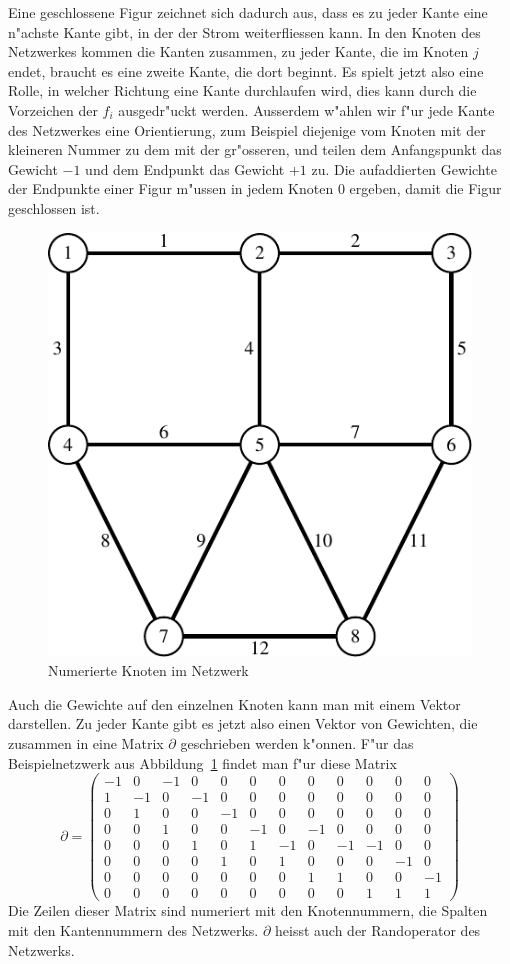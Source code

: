 Eine geschlossene Figur zeichnet sich dadurch aus, dass es zu
jeder Kante eine n"achste Kante gibt, in der der Strom weiterfliessen
kann. In den Knoten des Netzwerkes kommen die Kanten zusammen,
zu jeder Kante, die im Knoten $j$ endet, braucht es eine zweite
Kante, die dort beginnt.
Es spielt jetzt also eine Rolle, in welcher Richtung eine
Kante durchlaufen wird, dies kann durch die Vorzeichen der $f_i$
ausgedr"uckt werden. Ausserdem w"ahlen wir f"ur jede Kante
des Netzwerkes eine Orientierung, zum Beispiel diejenige vom
Knoten mit der kleineren Nummer zu dem mit der gr"osseren,
und teilen dem Anfangspunkt
das Gewicht $-1$ und dem Endpunkt das Gewicht $+1$ zu. Die
aufaddierten Gewichte der Endpunkte einer Figur m"ussen in jedem
Knoten $0$ ergeben, damit die Figur geschlossen ist.
\begin{figure}
\begin{center}
\includegraphics[width=0.6\hsize]{images/kirchhoff-2}
\end{center}
\caption{Numerierte Knoten im Netzwerk\label{netzwerk-numeriert}}
\end{figure}
Auch die Gewichte auf den einzelnen Knoten kann man mit einem
Vektor darstellen. Zu jeder Kante gibt es jetzt also einen
Vektor von Gewichten, die zusammen in eine Matrix $\partial$
geschrieben werden k"onnen.
F"ur das Beispielnetzwerk aus Abbildung~\ref{netzwerk-numeriert}
findet man f"ur diese Matrix
\setcounter{MaxMatrixCols}{12}
\[
\partial=\begin{pmatrix}
-1& 0&-1& 0& 0& 0& 0& 0& 0& 0& 0& 0\\
 1&-1& 0&-1& 0& 0& 0& 0& 0& 0& 0& 0\\
 0& 1& 0& 0&-1& 0& 0& 0& 0& 0& 0& 0\\
 0& 0& 1& 0& 0&-1& 0&-1& 0& 0& 0& 0\\
 0& 0& 0& 1& 0& 1&-1& 0&-1&-1& 0& 0\\
 0& 0& 0& 0& 1& 0& 1& 0& 0& 0&-1& 0\\
 0& 0& 0& 0& 0& 0& 0& 1& 1& 0& 0&-1\\
 0& 0& 0& 0& 0& 0& 0& 0& 0& 1& 1& 1
\end{pmatrix}
\]
Die Zeilen dieser Matrix sind numeriert mit den Knotennummern,
die Spalten mit den Kantennummern des Netzwerks. $\partial$
heisst auch der Randoperator des Netzwerks.

